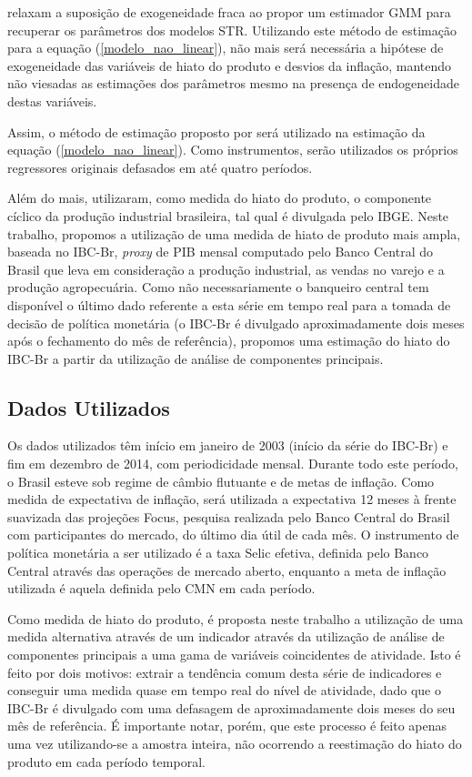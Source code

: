 \documentclass[
	article,			%
	11pt,				%
	oneside,			%
	a4paper,			%
	english,			%
	brazil,				%
	]{abntex2}
\begin{document}
	 relaxam a suposição de exogeneidade fraca ao propor um estimador GMM para recuperar os parâmetros dos modelos STR.	Utilizando este método de estimação para a equação (\ref{modelo_nao_linear}), não mais será necessária a hipótese de exogeneidade das variáveis de hiato do produto e desvios da inflação, mantendo não viesadas as estimações dos parâmetros mesmo na presença de endogeneidade destas variáveis.
	
	Assim, o método de estimação proposto por  será utilizado na estimação da equação (\ref{modelo_nao_linear}). Como instrumentos, serão utilizados os próprios regressores originais defasados em até quatro períodos.
	
	Além do mais,  utilizaram, como medida do hiato do produto, o componente cíclico da produção industrial brasileira, tal qual é divulgada pelo IBGE. Neste trabalho, propomos a utilização de uma medida de hiato de produto mais ampla, baseada no IBC-Br, \textsl{proxy} de PIB mensal computado pelo Banco Central do Brasil que leva em consideração a produção industrial, as vendas no varejo e a produção agropecuária. Como não necessariamente o banqueiro central tem disponível o último dado referente a esta série em tempo real para a tomada de decisão de política monetária (o IBC-Br é divulgado aproximadamente dois meses após o fechamento do mês de referência), propomos uma estimação do hiato do IBC-Br a partir da utilização de análise de componentes principais.
	
	
	
	\subsection{Dados Utilizados}
	Os dados utilizados têm início em janeiro de 2003 (início da série do IBC-Br) e fim em dezembro de 2014, com periodicidade mensal. Durante todo este período, o Brasil esteve sob regime de câmbio flutuante e de metas de inflação. Como medida de expectativa de inflação, será utilizada a expectativa 12 meses à frente suavizada das projeções Focus, pesquisa realizada pelo Banco Central do Brasil com participantes do mercado, do último dia útil de cada mês. O instrumento de política monetária a ser utilizado é a taxa Selic efetiva, definida pelo Banco Central através das operações de mercado aberto, enquanto a meta de inflação utilizada é aquela definida pelo CMN em cada período.
	
	Como medida de hiato do produto, é proposta neste trabalho a utilização de uma medida alternativa através de um indicador através da utilização de análise de componentes principais a uma gama de variáveis coincidentes de atividade. Isto é feito por dois motivos: extrair a tendência comum desta série de indicadores e conseguir uma medida quase em tempo real do nível de atividade, dado que o IBC-Br é divulgado com uma defasagem de aproximadamente dois meses do seu mês de referência. É importante notar, porém, que este processo é feito apenas uma vez utilizando-se a amostra inteira, não ocorrendo a reestimação do hiato do produto em cada período temporal.
	
\end{document}
